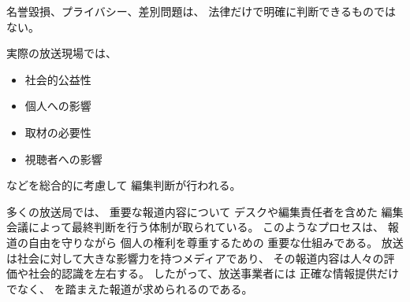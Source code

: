 名誉毀損、プライバシー、差別問題は、
法律だけで明確に判断できるものではない。

実際の放送現場では、

\begin{itemize}
  \item 社会的公益性
  \item 個人への影響
  \item 取材の必要性
  \item 視聴者への影響
\end{itemize}

などを総合的に考慮して
編集判断が行われる。

多くの放送局では、
重要な報道内容について
デスクや編集責任者を含めた
編集会議によって最終判断を行う体制が取られている。
このようなプロセスは、
報道の自由を守りながら
個人の権利を尊重するための
重要な仕組みである。
放送は社会に対して大きな影響力を持つメディアであり、
その報道内容は人々の評価や社会的認識を左右する。
したがって、放送事業者には
正確な情報提供だけでなく、
を踏まえた報道が求められるのである。
